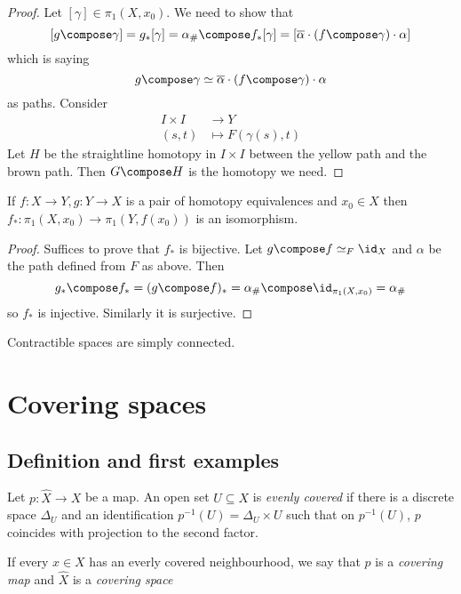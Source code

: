 \documentclass[a4paper]{article}
\begin{document}
\begin{proof}
  Let \([\gamma] \in \pi_1(X, x_0)\). We need to show that
  \[
    [g \compose \gamma] = g_*[\gamma] = \alpha_\# \compose f_*[\gamma] = [\overline \alpha \cdot (f \compose \gamma) \cdot \alpha]
  \]
  which is saying
  \[
    g \compose \gamma \simeq \overline \alpha \cdot (f \compose \gamma) \cdot \alpha
  \]
  as paths. Consider
  \begin{align*}
    I \times I &\to Y \\
    (s, t) &\mapsto F(\gamma(s), t)
  \end{align*}
  Let \(H\) be the straightline homotopy in \(I \times I\) between the yellow path and the brown path. Then \(G \compose H\) is the homotopy we need.
\end{proof}

\begin{theorem}
  If \(f: X \to Y, g: Y \to X\) is a pair of homotopy equivalences and \(x_0 \in X\) then \(f_*: \pi_1(X, x_0) \to \pi_1(Y, f(x_0))\) is an isomorphism.
\end{theorem}

\begin{proof}
  Suffices to prove that \(f_*\) is bijective. Let \(g \compose f \simeq_F \id_X\) and \(\alpha\) be the path defined from \(F\) as above. Then
  \[
    g_* \compose f_* = (g \compose f)_* = \alpha_\# \compose \id_{\pi_1(X, x_0)} = \alpha_\#
  \]
  so \(f_*\) is injective. Similarly it is surjective.
\end{proof}

\begin{corollary}
  Contractible spaces are simply connected.
\end{corollary}

\section{Covering spaces}

\subsection{Definition and first examples}

\begin{definition}
  Let \(p: \hat X \to X\) be a map. An open set \(U \subseteq X\) is \emph{evenly covered} if there is a discrete space \(\Delta_U\) and an identification \(p^{-1}(U) = \Delta_U \times U\) such that on \(p^{-1}(U)\), \(p\) coincides with projection to the second factor.

  If every \(x \in X\) has an everly covered neighbourhood, we say that \(p\) is a \emph{covering map} and \(\hat X\) is a \emph{covering space}
\end{definition}
\end{document}
